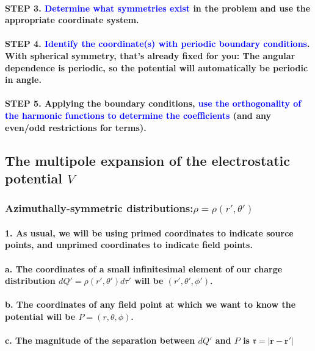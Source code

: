 \documentclass{article}
\begin{document}
\paragraph{STEP 3. \textcolor{blue}{Determine what symmetries exist} in the problem and use the appropriate coordinate system.}
\paragraph{STEP 4. \textcolor{blue}{Identify the coordinate(s) with periodic boundary conditions}. With spherical symmetry, that's already fixed for you: The angular dependence is periodic, so the potential will automatically be periodic in angle.}
\paragraph{STEP 5. Applying the boundary conditions, \textcolor{blue}{use the orthogonality of the harmonic functions to determine the coefficients} (and any even/odd restrictions for terms).}
\subsection{The multipole expansion of the electrostatic potential $V$}
\subsubsection{Azimuthally-symmetric distributions:$\rho=\rho(r',\theta')$}
\paragraph{1. As usual, we will be using primed coordinates to indicate source points, and unprimed coordinates to indicate field points.}
\paragraph{\indent a. The coordinates of a small infinitesimal element of our charge distribution $dQ'=\rho(r',\theta')d\tau'$ will be $(r',\theta', \phi')$.}
\paragraph{\indent b. The coordinates of any field point at which we want to know the potential will be $P=(r,\theta,\phi)$.}
\paragraph{\indent c. The magnitude of the separation between $dQ'$ and $P$ is $\mathfrak{r}=|\boldsymbol{r}-\boldsymbol{r'}|$}
\end{document}
